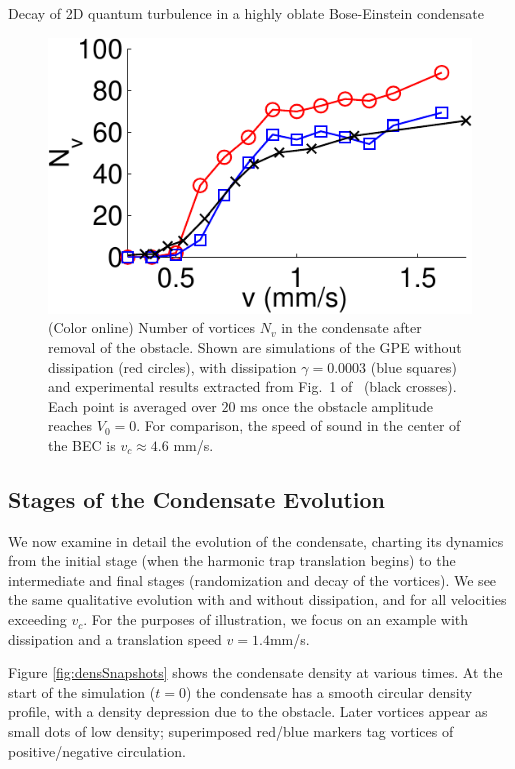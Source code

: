 \begin{chapter}{\label{cha:shin}Decay of 2D quantum turbulence in a highly oblate Bose-Einstein condensate}
\begin{figure}
\begin{minipage}{0.5\textwidth}
\centering
\includegraphics[width=0.9\linewidth]{shin/fig1}
\end{minipage} \hfill
\begin{minipage}{0.5\textwidth}
\caption{\label{fig:N_vV} (Color online) Number of vortices $N_v$ in the condensate after removal of the obstacle. Shown are simulations of the GPE without dissipation (red circles), with dissipation $\gamma = 0.0003$ (blue squares) and experimental results extracted from Fig.~1 of~\citep{kwon_moon_14} (black crosses). Each point is averaged over $20$ ms once the obstacle amplitude reaches $V_0=0$.  For comparison, the speed of sound in the center of the BEC is $v_c\approx 4.6$ mm/s.  }
\end{minipage} \hfill
\end{figure}

\subsection{Stages of the Condensate Evolution}

We now examine in detail the evolution of the condensate, 
charting its dynamics from the initial stage (when the
harmonic trap translation begins) to the intermediate and final stages 
(randomization and decay of the vortices).  We see the same 
qualitative evolution with and without dissipation, and for all 
velocities exceeding $v_c$.  For the purposes of illustration, 
we focus on an example with dissipation and a translation 
speed $v=1.4$mm/s. 


Figure \ref{fig:densSnapshots} shows the condensate density at various times. At the start of the simulation ($t=0$) the condensate has a smooth circular density profile, with a density depression due to the obstacle.  Later vortices appear as small dots of low density; superimposed red/blue markers tag vortices of positive/negative circulation.


\end{chapter}
